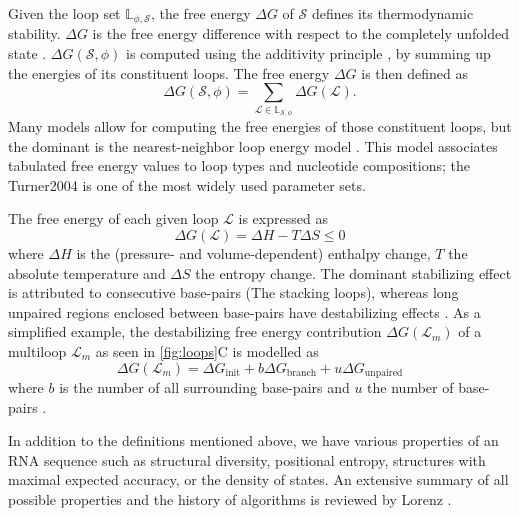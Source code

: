 \begin{mydef}
	\label{def:free_energy}
	Given the loop set $\mathbb{L}_{\phi, \mathcal{S}}$, the free energy \(\Delta G\) of $\mathcal{S}$ defines its thermodynamic stability. \(\Delta G\) is the free energy difference with respect to the completely unfolded state \cite{tinoco_estimation_1971}. \(\Delta G (\mathcal{S}, \phi)\) is computed using the additivity principle \cite{dill97_addit_princ_bioch}, by summing up the energies of its constituent loops. The free energy \(\Delta G\) is then defined as
	\begin{equation}
	\Delta G(\mathcal{S}, \phi) = \sum_{\mathcal{L}\in \mathbb{L}_{\mathcal{S}, \phi}}{ \Delta G(\mathcal{L}) }.
	\end{equation}
	Many models allow for computing the free energies of those constituent loops, but the dominant is the nearest-neighbor loop energy model \cite{turner09_nndb}. This model associates tabulated free energy values to loop types and nucleotide compositions; the Turner2004 \cite{mathews2004incorporating} is one of the most widely used parameter sets. 
	
	The free energy of each given loop $\mathcal{L}$ is expressed as
	\begin{equation}\label{eq:gibbs}
	\Delta G (\mathcal{L}) = \Delta H - T \Delta S \leq 0
	\end{equation}
	where $\Delta H$ is the (pressure- and volume-dependent) enthalpy change, $T$ the absolute temperature and $\Delta S$ the entropy change. 
	The dominant stabilizing effect is attributed to consecutive base-pairs (The stacking loops), whereas long unpaired regions enclosed between base-pairs have destabilizing effects \cite{fresco_molecular_1960, hofacker_rna_2006}. As a simplified example, the destabilizing free energy contribution $\Delta G(\mathcal{L}_m)$ of a multiloop $\mathcal{L}_m$  as seen in \autoref{fig:loops}C is modelled as
	\begin{equation}\label{eq:multi}
	\Delta G(\mathcal{L}_m) = \Delta G_\mathrm{init} + b \Delta G_\mathrm{branch} + u \Delta G_\mathrm{unpaired}
	\end{equation}
	where $b$ is the number of all surrounding base-pairs and $u$ the number of base-pairs \parencite{dirks_partition_2003}.
\end{mydef}

In addition to the definitions mentioned above, we have various properties of an \ac{RNA} sequence such as structural diversity, positional entropy, structures with maximal expected accuracy, or the density of states. An extensive summary of all possible properties and the history of algorithms is reviewed by Lorenz \cite{lorenz2016predicting}.

